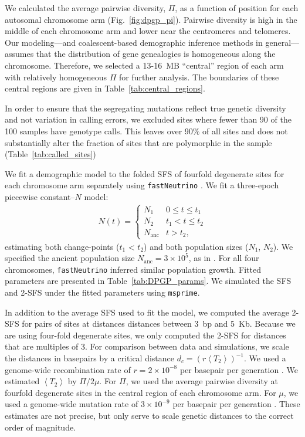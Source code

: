 \documentclass[11pt, letterpaper]{article}   	%
\newcommand{\fig}[1]{Fig.~\ref{#1}}
\newcommand{\E}[1]{\left< #1 \right>}
\begin{document}
We calculated the average pairwise diversity, $\Pi$, as a function of position for each autosomal chromosome arm (\fig{fig:dpgp_pi}).
Pairwise diversity is high in the middle of each chromosome arm and lower near the centromeres and telomeres.
Our modeling---and coalescent-based demographic inference methods in general---assumes that the distribution of gene genealogies is homogeneous along the chromosome.
Therefore, we selected a 13-16~MB ``central'' region of each arm with relatively homogeneous $\Pi$ for further analysis.
The boundaries of these central regions are given in Table~\ref{tab:central_regions}.

In order to ensure that the segregating mutations reflect true genetic diversity and not variation in calling errors, we excluded sites where fewer than 90 of the 100 samples have genotype calls.
This leaves over 90\% of all sites and does not substantially alter the fraction of sites that are polymorphic in the sample (Table~\ref{tab:called_sites})

We fit a demographic model to the folded SFS of fourfold degenerate sites for each chromosome arm separately using \texttt{fastNeutrino} \autocite{BhaskarEtAl2015}.
We fit a three-epoch piecewise constant--$N$ model:
\begin{align}
    N(t) = \begin{cases}
                N_1 & 0 \leq t \leq t_1 \\
                N_2 & t_1 <  t \leq t_2 \\
                N_{\text{anc}} & t > t_2,
            \end{cases}
    \label{eq:piecewise}
\end{align}
estimating both change-points ($t_1$ < $t_2$) and both population sizes ($N_1$, $N_2$).
We specified the ancient population size $N_{\text{anc}} = 3\times 10^5$, as in \cite{RagsdaleGutenkunst2017}.
For all four chromosomes, \texttt{fastNeutrino} inferred similar population growth.
Fitted parameters are presented in Table~\ref{tab:DPGP_params}.
We simulated the SFS and 2-SFS under the fitted parameters using \texttt{msprime}.

In addition to the average SFS used to fit the model, we computed the average 2-SFS for pairs of sites at distances distances between 3~bp and 5~Kb.
Because we are using four-fold degenerate sites, we only computed the 2-SFS for distances that are multiples of 3.
For comparison between data and simulations, we scale the distances in basepairs by a critical distance $d_c = (r\E{T_2})^{-1}$.
We used a genome-wide recombination rate of $r = 2 \times 10^{-8}$ per basepair per generation \autocite{ComeronEtAl2012}.
We estimated $\E{T_2}$ by $\Pi / 2 \mu$.
For $\Pi$, we used the average pairwise diversity at fourfold degenerate sites in the central region of each chromosome arm.
For $\mu$, we used a genome-wide mutation rate of $3 \times 10^{-9}$ per basepair per generation \autocite{KeightlyEtAl2014}.
These estimates are not precise, but only serve to scale genetic distances to the correct order of magnitude.
\end{document}
